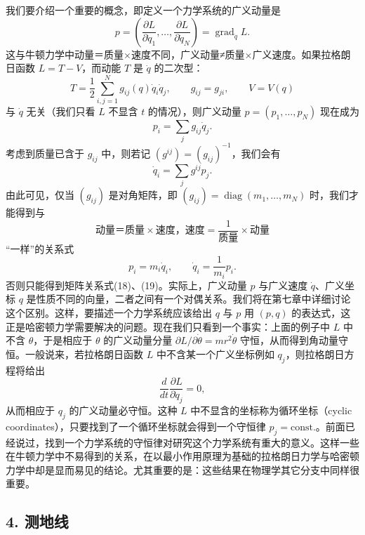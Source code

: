 我们要介绍一个重要的概念，即定义一个力学系统的广义动量是
\[
 p=\left(\frac{\partial L}{\partial\dot q_1},\ldots,
 \frac{\partial L}{\partial\dot q_N}\right)=\operatorname{grad}_{\dot q}L.
\]
这与牛顿力学中动量＝质量$\times$速度不同，广义动量≠质量$\times$广义速度。如果拉格朗日函数 $L=T-V$，而动能 $T$ 是 $\dot q$ 的二次型：
\[
 T=\frac12\sum_{i,j=1}^{N}g_{ij}(q)\dot q_i\dot q_j,
 \qquad g_{ij}=g_{ji},
 \qquad V=V(q)
\]
与 $\dot q$ 无关（我们只看 $L$ 不显含 $t$ 的情况），则广义动量 $p=(p_1,\ldots,p_N)$ 现在成为
\begin{equation}
 p_i=\sum_j g_{ij}\dot q_j.
 \tag{18}
\end{equation}
考虑到质量已含于 $g_{ij}$ 中，则若记 $(g^{ij})=(g_{ij})^{-1}$，我们会有
\begin{equation}
 \dot q_i=\sum_j g^{ij}p_j.
 \tag{19}
\end{equation}
由此可见，仅当 $(g_{ij})$ 是对角矩阵，即 $(g_{ij})=\operatorname{diag}(m_1,\ldots,m_N)$ 时，我们才能得到与
\[
 \text{动量＝质量}\times\text{速度，速度}=\frac1{\text{质量}}\times\text{动量}
\]
“一样”的关系式
\begin{equation}
 p_i=m_i\dot q_i,
 \qquad
 \dot q_i=\frac1{m_i}p_i.
 \tag{20}
\end{equation}
否则只能得到矩阵关系式(18)、(19)。实际上，广义动量 $p$ 与广义速度 $\dot q$、广义坐标 $q$ 是性质不同的向量，二者之间有一个对偶关系。我们将在第七章中详细讨论这个区别。这样，要描述一个力学系统应该给出 $q$ 与 $p$ 用 $(p,q)$ 的表达式，这正是哈密顿力学需要解决的问题。现在我们只看到一个事实：上面的例子中 $L$ 中不含 $\theta$，于是相应于 $\theta$ 的广义动量分量 $\partial L/\partial\dot\theta=mr^2\dot\theta$ 守恒，从而得到角动量守恒。一般说来，若拉格朗日函数 $L$ 中不含某一个广义坐标例如 $q_j$，则拉格朗日方程将给出
\[
 \frac d{dt}\frac{\partial L}{\partial\dot q_j}=0,
\]
从而相应于 $q_j$ 的广义动量必守恒。这种 $L$ 中不显含的坐标称为循环坐标（cyclic coordinates），只要找到了一个循环坐标就会得到一个守恒律 $p_j=\mathrm{const.}$。前面已经说过，找到一个力学系统的守恒律对研究这个力学系统有重大的意义。这样一些在牛顿力学中不易得到的关系，在以最小作用原理为基础的拉格朗日力学与哈密顿力学中却是显而易见的结论。尤其重要的是：这些结果在物理学其它分支中同样很重要。

\subsection*{4. 测地线}

